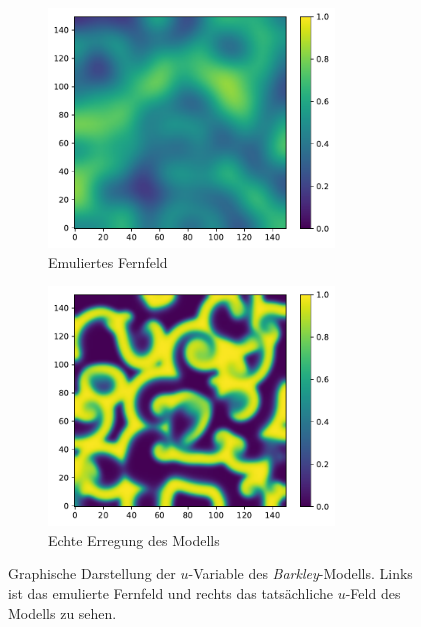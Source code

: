 \begin{figure}[h]
	\centering
	\begin{subfigure}{.5\textwidth}
		\centering
		\includegraphics[height=2.5in]{figures/results/unblur/barkley_u_blur_blured.pdf}
		\setcapmargin[1cm]{1cm}
		\caption{Emuliertes Fernfeld}
		\label{fig:exp_unblur_barkley_blurred}
	\end{subfigure}%
	\begin{subfigure}{.5\textwidth}
		\centering
		\includegraphics[height=2.5in]{figures/results/unblur/barkley_u_blur_orig.pdf}
		\setcapmargin[1cm]{1cm}
  		\caption{Echte Erregung des Modells}
  		\label{fig:exp_unblur_barkley_orig}
	\end{subfigure}
	\caption{Graphische Darstellung der $u$-Variable des \textit{Barkley}-Modells. Links ist das emulierte Fernfeld und rechts das tatsächliche $u$-Feld des Modells zu sehen.}
	\label{fig:exp_unblur_barkley}
\end{figure} 

